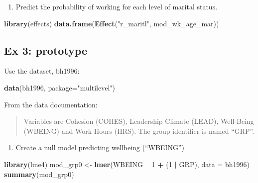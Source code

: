 \documentclass[]{book}
\newenvironment{Shaded}{\begin{snugshade}}{\end{snugshade}}
\newcommand{\KeywordTok}[1]{\textcolor[rgb]{0.13,0.29,0.53}{\textbf{#1}}}
\newcommand{\DataTypeTok}[1]{\textcolor[rgb]{0.13,0.29,0.53}{#1}}
\newcommand{\DecValTok}[1]{\textcolor[rgb]{0.00,0.00,0.81}{#1}}
\newcommand{\StringTok}[1]{\textcolor[rgb]{0.31,0.60,0.02}{#1}}
\newcommand{\OperatorTok}[1]{\textcolor[rgb]{0.81,0.36,0.00}{\textbf{#1}}}
\newcommand{\NormalTok}[1]{#1}
\providecommand{\tightlist}{%
  \setlength{\itemsep}{0pt}\setlength{\parskip}{0pt}}
\begin{document}
\begin{enumerate}
\def\labelenumi{\arabic{enumi}.}
\setcounter{enumi}{1}
\tightlist
\item
  Predict the probability of working for each level of marital status.
\end{enumerate}

\begin{Shaded}
\begin{Highlighting}[]
  \KeywordTok{library}\NormalTok{(effects)}
  \KeywordTok{data.frame}\NormalTok{(}\KeywordTok{Effect}\NormalTok{(}\StringTok{"r_maritl"}\NormalTok{, mod_wk_age_mar))}
\end{Highlighting}
\end{Shaded}

\subsection{Ex 3: prototype}\label{ex-3-prototype-1}

Use the dataset, bh1996:

\begin{Shaded}
\begin{Highlighting}[]
  \KeywordTok{data}\NormalTok{(bh1996, }\DataTypeTok{package=}\StringTok{"multilevel"}\NormalTok{)}
\end{Highlighting}
\end{Shaded}

From the data documentation:

\begin{quote}
Variables are Cohesion (COHES), Leadership Climate (LEAD), Well-Being
(WBEING) and Work Hours (HRS). The group identifier is named ``GRP''.
\end{quote}

\begin{enumerate}
\def\labelenumi{\arabic{enumi}.}
\tightlist
\item
  Create a null model predicting wellbeing (``WBEING'')
\end{enumerate}

\begin{Shaded}
\begin{Highlighting}[]
  \KeywordTok{library}\NormalTok{(lme4)}
\NormalTok{  mod_grp0 <-}\StringTok{ }\KeywordTok{lmer}\NormalTok{(WBEING }\OperatorTok{~}\StringTok{ }\DecValTok{1} \OperatorTok{+}\StringTok{ }\NormalTok{(}\DecValTok{1} \OperatorTok{|}\StringTok{ }\NormalTok{GRP), }\DataTypeTok{data =}\NormalTok{ bh1996)}
  \KeywordTok{summary}\NormalTok{(mod_grp0)}
\end{Highlighting}
\end{Shaded}
\end{document}
